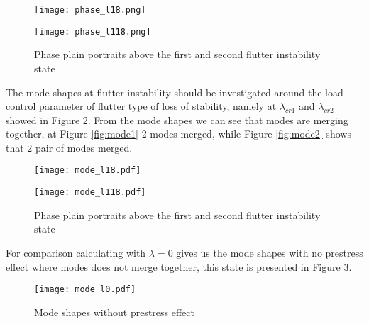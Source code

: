 \documentclass[12pt]{article}
\begin{document}
\begin{figure}[H]
	\centering
	\begin{minipage}[b]{0.47\textwidth}
	\centering
	\texttt{[image: phase\_l18.png]}
	\label{fig:phase1}
	\end{minipage}\hfill
	\begin{minipage}[b]{0.47\textwidth}
	\centering
	\texttt{[image: phase\_l118.png]}
	\label{fig:phase2}
	\end{minipage}
	\caption{Phase plain portraits above the first and second flutter instability state}
	\label{fig:phase}
\end{figure}
\newpage
\noindent The mode shapes at flutter instability should be investigated around the load control parameter of flutter type of loss of stability, namely at $\lambda_{cr1}$ and $\lambda_{cr2}$ showed in Figure \ref{fig:mode}. From the mode shapes we can see that modes are merging together, at Figure \ref{fig:mode1} 2 modes merged, while Figure \ref{fig:mode2} shows that 2 pair of modes merged.


\begin{figure}[htbp]
	\centering
	\begin{minipage}[b]{0.47\textwidth}
	\centering
	\texttt{[image: mode\_l18.pdf]}
	\label{fig:mode1}
	\end{minipage}\hfill
	\begin{minipage}[b]{0.47\textwidth}
	\centering
	\texttt{[image: mode\_l118.pdf]}
	\label{fig:mode2}
	\end{minipage}
	\caption{Phase plain portraits above the first and second flutter instability state}
	\label{fig:mode}
\end{figure}

\noindent For comparison calculating with $\lambda = 0$ gives us the mode shapes with no prestress effect where modes does not merge together, this state is presented in Figure \ref{fig:mode_prestress}.

\begin{figure}[htbp]
\centering
\texttt{[image: mode\_l0.pdf]}
\caption{Mode shapes without prestress effect}
\label{fig:mode_prestress}
\end{figure}
\end{document}
